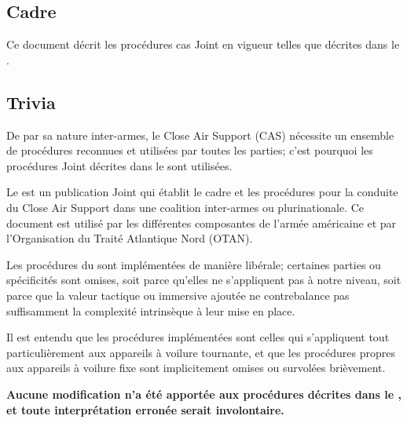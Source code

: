 
%

\begin{imini}
\subsection*{Cadre}

\vfil

Ce document décrit les procédures \acrfull{cas} Joint en vigueur telles que décrites dans le \jp{}.

\vfill

\subsection*{Trivia}

\vfil

De par sa nature inter-armes, le Close Air Support (CAS) nécessite un ensemble de procédures reconnues et utilisées par toutes les parties; c'est pourquoi les procédures Joint décrites dans le \jp{} sont utilisées.

\vfil

Le \jp{} est un publication Joint qui établit le cadre et les procédures pour la conduite du Close Air Support dans une coalition inter-armes ou plurinationale. Ce document est utilisé par les différentes composantes de l'armée américaine et par l'Organisation du Traité Atlantique Nord (OTAN).

\vfil

Les procédures du \jp{} sont implémentées de manière libérale; certaines parties ou spécificités sont omises, soit parce qu'elles ne s'appliquent pas à notre niveau, soit parce que la valeur tactique ou immersive ajoutée ne contrebalance pas suffisamment la complexité intrinsèque à leur mise en place.

\vfil

Il est entendu que les procédures implémentées sont celles qui s'appliquent tout particulièrement aux appareils à voilure tournante, et que les procédures propres aux appareils à voilure fixe sont implicitement omises ou survolées brièvement.

\vfil

\textbf{Aucune modification n'a été apportée aux procédures décrites dans le \jp{}, et toute interprétation erronée serait involontaire.}
\end{imini}